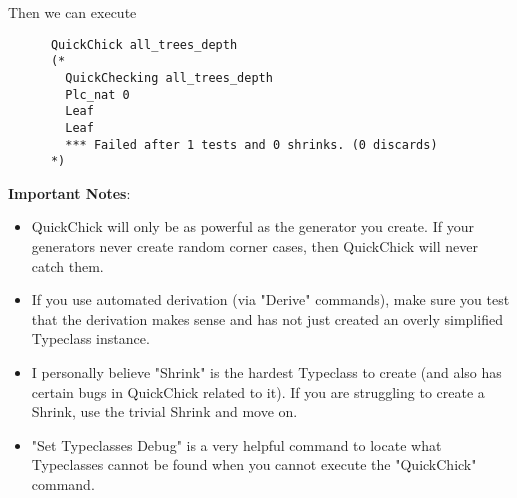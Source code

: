 \documentclass{article}
\begin{document}
    Then we can execute 
    \begin{verbatim}
      QuickChick all_trees_depth
      (*
        QuickChecking all_trees_depth
        Plc_nat 0
        Leaf
        Leaf
        *** Failed after 1 tests and 0 shrinks. (0 discards)
      *)
    \end{verbatim}
    \textbf{Important Notes}:
    \begin{itemize}
      \item QuickChick will only be as powerful as the generator you create. If your generators never create random corner cases, then QuickChick will never catch them.
      \item If you use automated derivation (via "Derive" commands), make sure you test that the derivation makes sense and has not just created an overly simplified Typeclass instance.
      \item I personally believe "Shrink" is the hardest Typeclass to create (and also has certain bugs in QuickChick related to it). If you are struggling to create a Shrink, use the trivial Shrink and move on.
      \item "Set Typeclasses Debug" is a very helpful command to locate what Typeclasses cannot be found when you cannot execute the "QuickChick" command.
    \end{itemize}
\end{document}
